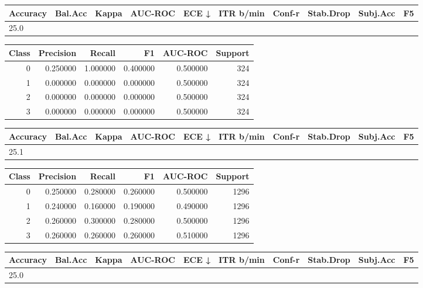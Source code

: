 \begin{tabular}{llrrrrrlll}
\toprule
Accuracy & Bal.Acc & Kappa & AUC-ROC & ECE ↓ & ITR b/min & Conf-r & Stab.Drop & Subj.Acc & F5 \\
\midrule
25.0%
\bottomrule
\end{tabular}


\begin{tabular}{rrrrrr}
\toprule
Class & Precision & Recall & F1 & AUC-ROC & Support \\
\midrule
0 & 0.250000 & 1.000000 & 0.400000 & 0.500000 & 324 \\
1 & 0.000000 & 0.000000 & 0.000000 & 0.500000 & 324 \\
2 & 0.000000 & 0.000000 & 0.000000 & 0.500000 & 324 \\
3 & 0.000000 & 0.000000 & 0.000000 & 0.500000 & 324 \\
\bottomrule
\end{tabular}


\begin{tabular}{llrrrrrlll}
\toprule
Accuracy & Bal.Acc & Kappa & AUC-ROC & ECE ↓ & ITR b/min & Conf-r & Stab.Drop & Subj.Acc & F5 \\
\midrule
25.1%
\bottomrule
\end{tabular}


\begin{tabular}{rrrrrr}
\toprule
Class & Precision & Recall & F1 & AUC-ROC & Support \\
\midrule
0 & 0.250000 & 0.280000 & 0.260000 & 0.500000 & 1296 \\
1 & 0.240000 & 0.160000 & 0.190000 & 0.490000 & 1296 \\
2 & 0.260000 & 0.300000 & 0.280000 & 0.500000 & 1296 \\
3 & 0.260000 & 0.260000 & 0.260000 & 0.510000 & 1296 \\
\bottomrule
\end{tabular}


\begin{tabular}{llrrrrrlll}
\toprule
Accuracy & Bal.Acc & Kappa & AUC-ROC & ECE ↓ & ITR b/min & Conf-r & Stab.Drop & Subj.Acc & F5 \\
\midrule
25.0%
\bottomrule
\end{tabular}


